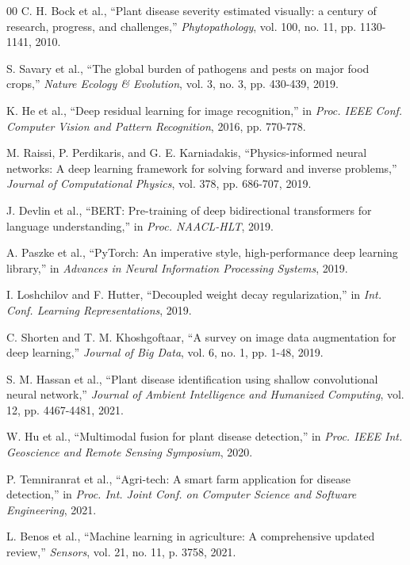 \documentclass[conference]{IEEEtran}
\begin{document}
\begin{thebibliography}{00}
C. H. Bock et al., ``Plant disease severity estimated visually: a century of research, progress, and challenges,'' \textit{Phytopathology}, vol. 100, no. 11, pp. 1130-1141, 2010.

S. Savary et al., ``The global burden of pathogens and pests on major food crops,'' \textit{Nature Ecology \& Evolution}, vol. 3, no. 3, pp. 430-439, 2019.

K. He et al., ``Deep residual learning for image recognition,'' in \textit{Proc. IEEE Conf. Computer Vision and Pattern Recognition}, 2016, pp. 770-778.

M. Raissi, P. Perdikaris, and G. E. Karniadakis, ``Physics-informed neural networks: A deep learning framework for solving forward and inverse problems,'' \textit{Journal of Computational Physics}, vol. 378, pp. 686-707, 2019.

J. Devlin et al., ``BERT: Pre-training of deep bidirectional transformers for language understanding,'' in \textit{Proc. NAACL-HLT}, 2019.

A. Paszke et al., ``PyTorch: An imperative style, high-performance deep learning library,'' in \textit{Advances in Neural Information Processing Systems}, 2019.

I. Loshchilov and F. Hutter, ``Decoupled weight decay regularization,'' in \textit{Int. Conf. Learning Representations}, 2019.

C. Shorten and T. M. Khoshgoftaar, ``A survey on image data augmentation for deep learning,'' \textit{Journal of Big Data}, vol. 6, no. 1, pp. 1-48, 2019.

S. M. Hassan et al., ``Plant disease identification using shallow convolutional neural network,'' \textit{Journal of Ambient Intelligence and Humanized Computing}, vol. 12, pp. 4467-4481, 2021.

W. Hu et al., ``Multimodal fusion for plant disease detection,'' in \textit{Proc. IEEE Int. Geoscience and Remote Sensing Symposium}, 2020.

P. Temniranrat et al., ``Agri-tech: A smart farm application for disease detection,'' in \textit{Proc. Int. Joint Conf. on Computer Science and Software Engineering}, 2021.

L. Benos et al., ``Machine learning in agriculture: A comprehensive updated review,'' \textit{Sensors}, vol. 21, no. 11, p. 3758, 2021.


\end{thebibliography}
\end{document}
